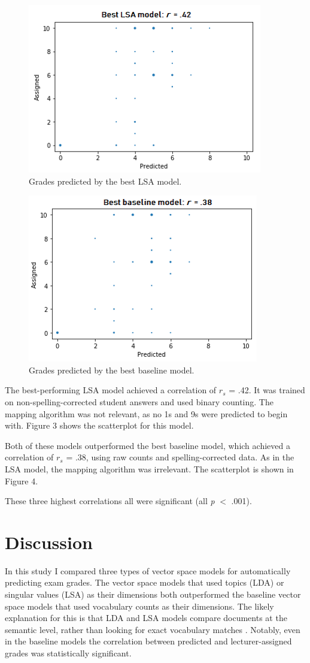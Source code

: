 \documentclass[a4paper,10pt,twoside]{article}
\begin{document}
\begin{figure}
	\centering
	\includegraphics[width=0.5\linewidth]{"Best LSA model"}
	\caption{Grades predicted by the best LSA model.}
	\label{lsa}
\end{figure}

\begin{figure}
	\centering
	\includegraphics[width=0.5\linewidth]{"Best baseline model"}
	\caption{Grades predicted by the best baseline model.}
	\label{baseline}
\end{figure}

The best-performing LSA model achieved a correlation of $\textit{r}_s$ = .42. It was trained on non-spelling-corrected student answers and used binary counting. The mapping algorithm was not relevant, as no 1s and 9s were predicted to begin with. Figure 3 shows the scatterplot for this model.

Both of these models outperformed the best baseline model, which achieved a correlation of $\textit{r}_s$ = .38, using raw counts and spelling-corrected data. As in the LSA model, the mapping algorithm was irrelevant. The scatterplot is shown in Figure 4.

These three highest correlations all were significant (all \textit{p} $<$ .001).

\section{Discussion}
In this study I compared three types of vector space models for automatically predicting exam grades. The vector space models that used topics (LDA) or singular values (LSA) as their dimensions both outperformed the baseline vector space models that used vocabulary counts as their dimensions. The likely explanation for this is that LDA and LSA models compare documents at the semantic level, rather than looking for exact vocabulary matches \cite{kakkonen2008}. Notably, even in the baseline models the correlation between predicted and lecturer-assigned grades was statistically significant.
\end{document}
